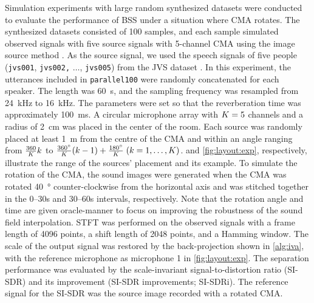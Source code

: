 \documentclass[sip,biber]{now-journal}
\begin{document}
Simulation experiments with large random synthesized datasets were conducted to evaluate the performance of BSS under a situation where CMA rotates.
The synthesized datasets consisted of 100 samples, and each sample simulated observed signals with five source signals with 5-channel CMA using the image source method \cite{Allen:1979:JASA}.
As the source signal, we used the speech signals of five people (\texttt{jvs001}, \texttt{jvs002,} $\hdots$, \texttt{jvs005}) from the JVS dataset \cite{Takamichi:2019:arxiv}.
In this experiment, the utterances included in \texttt{parallel100} were randomly concatenated for each speaker.
The length was \SI{60}{\second}, and the sampling frequency was resampled from \SI{24}{\kilo\hertz} to \SI{16}{\kilo\hertz}.
The parameters were set so that the reverberation time was approximately \SI{100}{\milli\second}.
A circular microphone array with $K = 5$ channels and a radius of \SI{2}{\centi\metre} was placed in the center of the room.
Each source was randomly placed at least \SI{1}{\metre} from the centre of the CMA and within an angle ranging from $\frac{360}{K} k$ to $\frac{360\si{\degree}}{K} (k - 1) + \frac{180\si{\degree}}{K}\; (k = 1, \dots, K)$.
 and \cref{fig:layout:exp}, respectively, illustrate the range of the sources' placement and its example.
To simulate the rotation of the CMA, the sound images were generated when the CMA was rotated \SI{40}{\degree} counter-clockwise from the horizontal axis and was stitched together in the 0--30\si{\second} and 30--60\si{\second} intervals, respectively.
Note that the rotation angle and time are given oracle-manner to focus on improving the robustness of the sound field interpolation.
STFT was performed on the observed signals with a frame length of 4096 points, a shift length of 2048 points, and a Hamming window.
The scale of the output signal was restored by the back-projection shown in \cref{alg:iva}, with the reference microphone as microphone 1 in \cref{fig:layout:exp}.
The separation performance was evaluated by the scale-invariant signal-to-distortion ratio (SI-SDR) \cite{LeRoux:2019:ICASSP} and its improvement (SI-SDR improvements; SI-SDRi).
The reference signal for the SI-SDR was the source image recorded with a rotated CMA.
\end{document}

